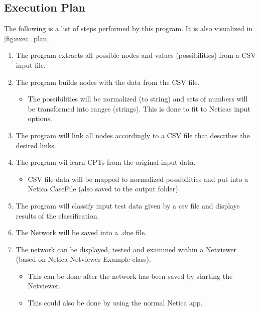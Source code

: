 \documentclass[12pt]{scrartcl}
\begin{document}
\subsection{Execution Plan}
The following is a list of steps performed by this program. It is also visualized in \autoref{fig:exec_plan}.
\begin{enumerate}
    \item The program extracts all possible nodes and values (possibilities) from a CSV input file.
    \item The program builds nodes with the data from the CSV file.
    \begin{itemize}
        \item The possibilities will be normalized (to string) and sets of numbers will be transformed into ranges (strings). This is done to fit to Neticas input options.
    \end{itemize}
    \item The program will link all nodes accordingly to a CSV file that describes the desired links.
    \item The program wil learn CPTs from the original input data.
    \begin{itemize}
        \item CSV file data will be mapped to normalized possibilities and put into a Netica CaseFile (also saved to the output folder).
    \end{itemize}
    \item The program will classify input test data given by a csv file and displays results of the classification.
    \item The Network will be saved into a .dne file.

    \item The network can be displayed, tested and examined within a Netviewer (based on Netica Netviewer Example class).
    \begin{itemize}
        \item This can be done after the network has been saved by starting the Netviewer.
        \item This could also be done by using the normal Netica app.
    \end{itemize}
\end{enumerate}
\end{document}
